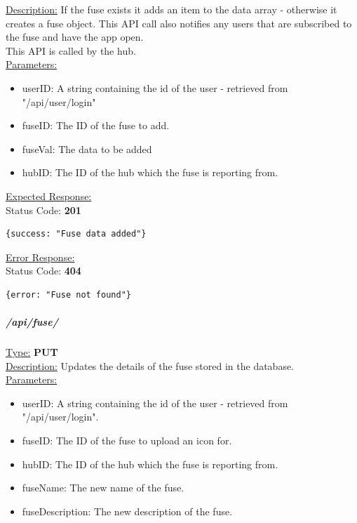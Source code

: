 \documentclass[draft,preprint,12pt,3p]{elsarticle}
\newcommand{\forceindent}{\leavevmode{\parindent=1em\indent}}
\begin{document}
\underline{Description:} If the fuse exists it adds an item to the data array - otherwise it creates a fuse object. This API call also notifies any users that are subscribed to the fuse and have the app open.\\
This API is called by the hub.\\

\underline{Parameters:}
\begin{itemize}
\item userID: A string containing the id of the user - retrieved from "/api/user/login"

\item fuseID: The ID of the fuse to add.

\item fuseVal: The data to be added

\item hubID: The ID of the hub which the fuse is reporting from.

\end{itemize}

\underline{Expected Response:}\\[5pt]
\forceindent Status Code: \textbf{201} \\
\begin{verbatim}
{success: "Fuse data added"}
\end{verbatim}
\underline{Error Response:}\\[5pt]
\forceindent Status Code: \textbf{404} \\
\begin{verbatim}
{error: "Fuse not found"}
\end{verbatim}

\subparagraph*{/api/fuse/}
\underline{Type:} \textbf{PUT}\\

\underline{Description:} Updates the details of the fuse stored in the database.\\

\underline{Parameters:}
\begin{itemize}
\item userID: A string containing the id of the user - retrieved from "/api/user/login".

\item fuseID: The ID of the fuse to upload an icon for.

\item hubID: The ID of the hub which the fuse is reporting from.

\item fuseName: The new name of the fuse.

\item fuseDescription: The new description of the fuse.
\end{itemize}
\end{document}
